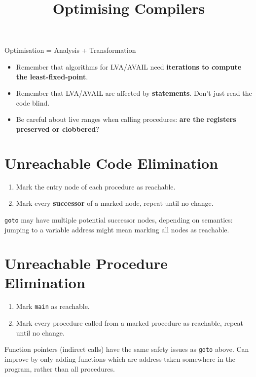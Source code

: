 \documentclass[a4paper, 11pt]{article}
\title{\vspace{-2.5cm}Optimising Compilers\vspace{-2cm}}
\author{}
\date{}
\begin{document}
\maketitle

Optimisation = Analysis + Transformation

\begin{itemize}
\item Remember that algorithms for LVA/AVAIL need \textbf{iterations to compute the least-fixed-point}.
\item Remember that LVA/AVAIL are affected by \textbf{ statements}. Don't just read the code blind.
\item Be careful about live ranges when calling procedures: \textbf{are the registers preserved or clobbered}?
\end{itemize}

\section*{Unreachable Code Elimination}
{
    \begin{enumerate}
    \item Mark the entry node of each procedure as reachable.
    \item Mark every \textbf{successor} of a marked node, repeat until no change.
    \end{enumerate}

    \texttt{goto} may have multiple potential successor nodes, depending on semantics: jumping to a variable address might mean marking all nodes as reachable.
}
\section*{Unreachable Procedure Elimination}
{
    \begin{enumerate}
    \item Mark \texttt{main} as reachable.
    \item Mark every procedure called from a marked procedure as reachable, repeat until no change.
    \end{enumerate}

    Function pointers (indirect calls) have the same safety issues as \texttt{goto} above. Can improve by only adding functions which are address-taken somewhere in the program, rather than all procedures.
}
\end{document}
